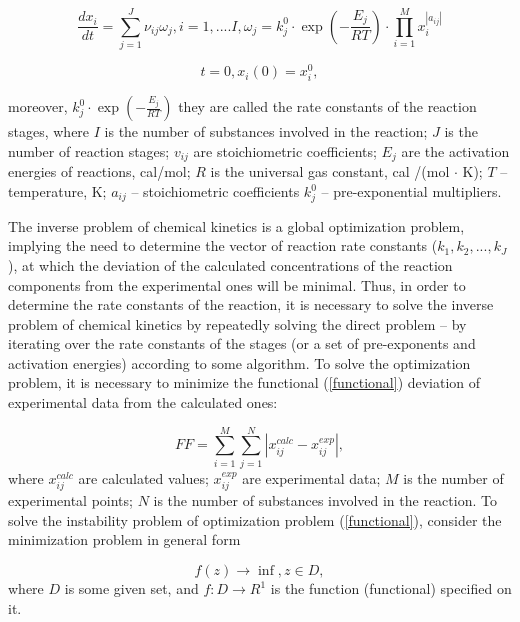 \documentclass{svproc}
\begin{document}
\begin{equation}
  \frac{dx_{i}}{dt} = \sum_{j=1} ^J \nu_{ij} \omega_j,i=1,....I,\omega_j=k_j^0 \cdot \exp (-\frac{E_{j}}{RT})\cdot \prod_{i=1} ^M x_{i}^{|a_{ij}|}
\label{concentration_changing}
\end{equation}

\begin{equation}
t=0, x_i(0)=x_i^0,
\label{init_cond}
\end{equation}

moreover, $k_j^0 \cdot \exp (-\frac{E_{j}}{RT})$ they are called the rate constants of the reaction stages, where $I$ is the number of substances involved in the reaction; $J$ is the number of reaction stages; $v_{ij}$ are stoichiometric coefficients; $E_j$ are the activation energies of reactions, cal/mol; $R$ is the universal gas constant, cal /(mol $\cdot$ K); $T$ – temperature, K; $a_{ij}$ – stoichiometric coefficients $k_j^0$ – pre-exponential multipliers.

The inverse problem of chemical kinetics is a global optimization problem, implying the need to determine the vector of reaction rate constants ($k_1, k_2, ..., k_J$), at which the deviation of the calculated concentrations of the reaction components from the experimental ones will be minimal.
Thus, in order to determine the rate constants of the reaction, it is necessary to solve the inverse problem of chemical kinetics by repeatedly solving the direct problem – by iterating over the rate constants of the stages (or a set of pre-exponents and activation energies) according to some algorithm. To solve the optimization problem, it is necessary to minimize the functional  (\ref{functional}) deviation of experimental data from the calculated ones:

\begin{equation}
FF = \sum_{i=1} ^M \sum_{j=1} ^N |x_{ij}^{calc} - x_{ij}^{exp}|,
\label{functional}
\end{equation}
where $x_{ij}^{calc}$ are calculated values; $x_{ij}^{exp}$ are experimental data; $M$ is the number of experimental points; $N$ is the number of substances involved in the reaction.
To solve the instability problem of optimization problem (\ref{functional}), consider the minimization problem in general form

\begin{equation}
f(z) \rightarrow \inf, z \in D,
\label{problem}
\end{equation}
where $D$ is some given set, and $f: D \rightarrow R^1$ is the function (functional) specified on it. 
\end{document}
